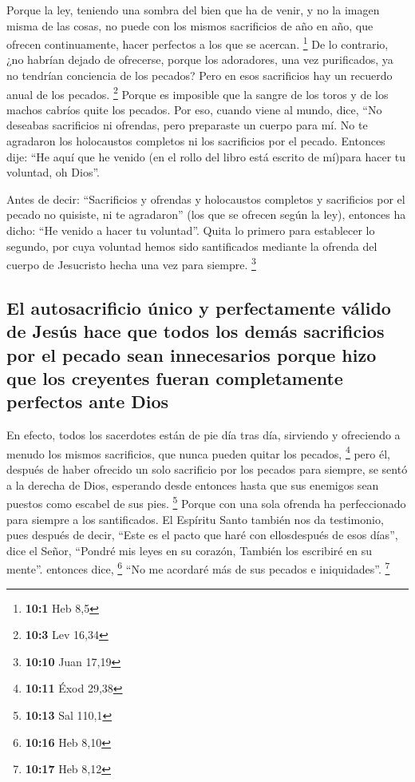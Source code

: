 Porque la ley, teniendo una sombra del bien que ha de
venir, y no la imagen misma de las cosas, no puede con los mismos
sacrificios de año en año, que ofrecen continuamente, hacer perfectos a
los que se acercan. \footnote{\textbf{10:1} Heb 8,5}  De
lo contrario, ¿no habrían dejado de ofrecerse, porque los adoradores,
una vez purificados, ya no tendrían conciencia de los pecados?
 Pero en esos sacrificios hay un recuerdo anual de los
pecados. \footnote{\textbf{10:3} Lev 16,34}  Porque es
imposible que la sangre de los toros y de los machos cabríos quite los
pecados.  Por eso, cuando viene al mundo, dice, ``No
deseabas sacrificios ni ofrendas, pero preparaste un cuerpo para mí.
 No te agradaron los holocaustos completos ni los
sacrificios por el pecado.  Entonces dije: ``He aquí que
he venido (en el rollo del libro está escrito de mí)para hacer tu
voluntad, oh Dios''.

 Antes de decir: ``Sacrificios y ofrendas y holocaustos
completos y sacrificios por el pecado no quisiste, ni te agradaron''
(los que se ofrecen según la ley),  entonces ha dicho:
``He venido a hacer tu voluntad''. Quita lo primero para establecer lo
segundo,  por cuya voluntad hemos sido santificados
mediante la ofrenda del cuerpo de Jesucristo hecha una vez para siempre.
\footnote{\textbf{10:10} Juan 17,19}

\hypertarget{el-autosacrificio-uxfanico-y-perfectamente-vuxe1lido-de-jesuxfas-hace-que-todos-los-demuxe1s-sacrificios-por-el-pecado-sean-innecesarios-porque-hizo-que-los-creyentes-fueran-completamente-perfectos-ante-dios}{%
\subsection{El autosacrificio único y perfectamente válido de Jesús hace
que todos los demás sacrificios por el pecado sean innecesarios porque
hizo que los creyentes fueran completamente perfectos ante
Dios}\label{el-autosacrificio-uxfanico-y-perfectamente-vuxe1lido-de-jesuxfas-hace-que-todos-los-demuxe1s-sacrificios-por-el-pecado-sean-innecesarios-porque-hizo-que-los-creyentes-fueran-completamente-perfectos-ante-dios}}

 En efecto, todos los sacerdotes están de pie día tras
día, sirviendo y ofreciendo a menudo los mismos sacrificios, que nunca
pueden quitar los pecados, \footnote{\textbf{10:11} Éxod 29,38}
 pero él, después de haber ofrecido un solo sacrificio
por los pecados para siempre, se sentó a la derecha de Dios,
 esperando desde entonces hasta que sus enemigos sean
puestos como escabel de sus pies. \footnote{\textbf{10:13} Sal 110,1}
 Porque con una sola ofrenda ha perfeccionado para
siempre a los santificados.  El Espíritu Santo también
nos da testimonio, pues después de decir,  ``Este es el
pacto que haré con ellosdespués de esos días'', dice el Señor, ``Pondré
mis leyes en su corazón, También los escribiré en su mente''. entonces
dice, \footnote{\textbf{10:16} Heb 8,10}  ``No me
acordaré más de sus pecados e iniquidades''. \footnote{\textbf{10:17}
  Heb 8,12}

